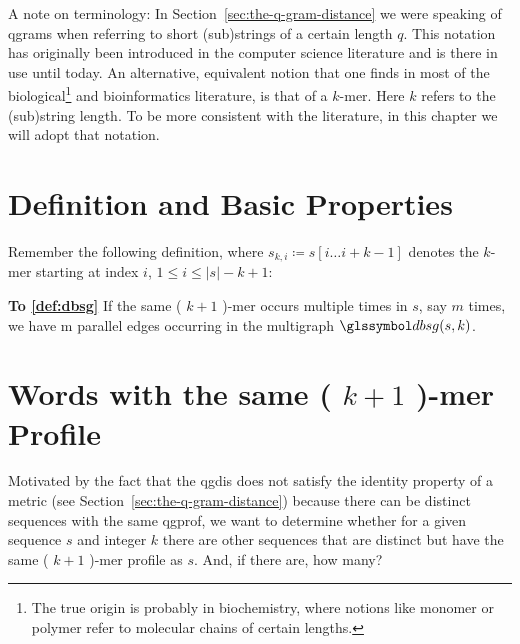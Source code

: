 

A note on terminology: In Section~\ref{sec:the-q-gram-distance} we were speaking of \glspl{qgram} when referring to short (sub)strings of a certain length $q$.
This notation has originally been introduced in the computer science literature and is there in use until today.
An alternative, equivalent notion that one finds in most of the biological\footnote{The true origin is probably in biochemistry, where notions like monomer or polymer refer to molecular chains of certain lengths.} and bioinformatics literature, is that of a $k$-mer.
Here $k$ refers to the (sub)string length.
To be more consistent with the literature, in this chapter we will adopt that notation.


\section{Definition and Basic Properties}\label{sec:definition-and-basic-properties}
Remember the following definition, where $s_{k,i} \coloneqq s[i \dots i+k-1]$ denotes the $k$-mer starting
at index $i$, $1 \leq i \leq |s| -k +1$:


\begin{notte}
    \textbf{To \autoref{def:dbsg}}
    If the same ( $k+1$ )-mer occurs multiple times in $s$, say $m$ times, we have m
    parallel edges occurring in the multigraph $\dbg(s, k)$.
\end{notte}




\section{Words with the same ( $k+1$ )-mer Profile}\label{sec:words-with-the-same-k-1-mer-profile}
Motivated by the fact that the \gls{qgdis} does not satisfy the identity property of a metric (see Section~\ref{sec:the-q-gram-distance}) because there can be distinct sequences with the same \gls{qgprof}, we want to determine
whether for a given sequence $s$ and integer $k$ there are other sequences that are distinct but have the same ( $k+1$ )-mer profile as $s$.
And, if there are, how many? \\ \newline

